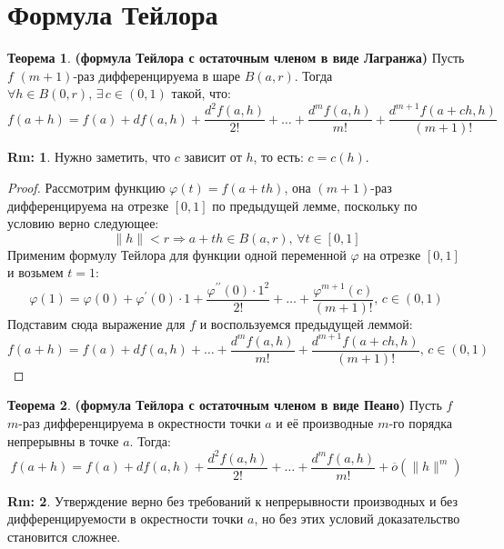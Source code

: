 \documentclass[12pt]{article}
\theoremstyle{definition}
\newtheorem{rem}{Rm:}
\newtheorem{theorem}{Теорема}
\begin{document}
\newpage
\section*{Формула Тейлора}
\begin{theorem}\textbf{(формула Тейлора с остаточным членом в виде Лагранжа)}
	Пусть $f$ $(m+1)$-раз дифференцируема в шаре $B(a,r)$. Тогда $\forall h \in B(0,r), \, \exists \, c \in (0,1)$ такой, что:
	$$ 
		f(a+h) = f(a) + df(a,h) + \dfrac{d^2f(a,h)}{2!} + \dotsc + \dfrac{d^mf(a,h)}{m!} + \dfrac{d^{m+1}f(a + ch,h)}{(m+1)!}
	$$
\end{theorem}
\begin{rem}
	Нужно заметить, что $c$ зависит от $h$, то есть: $c = c(h)$.
\end{rem}
\begin{proof}
	Рассмотрим функцию $\varphi(t) = f(a + th)$, она $(m+1)$-раз дифференцируема на отрезке $[0,1]$ по предыдущей лемме, поскольку по условию верно следующее: 
	$$
		\|h\| < r \Rightarrow a + th \in B(a,r), \, \forall t \in [0,1] 
	$$
	Применим формулу Тейлора для функции одной переменной $\varphi$ на отрезке $[0,1]$ и возьмем $t=1$:
	$$
		\varphi(1) = \varphi(0) + \varphi^\prime(0){\cdot}1 + \dfrac{\varphi^{\prime\prime}(0){\cdot}1^2}{2!} + \dotsc + \dfrac{\varphi^{m+1}(c)}{(m+1)!}, \, c \in (0,1)
	$$
	Подставим сюда выражение для $f$ и воспользуемся предыдущей леммой:
	$$
		f(a + h) = f(a) + df(a,h) + \dotsc + \dfrac{d^mf(a,h)}{m!} + \dfrac{d^{m+1}f(a + ch,h)}{(m+1)!}, \, c \in (0,1)
	$$
\end{proof}

\begin{theorem}\textbf{(формула Тейлора с остаточным членом в виде Пеано)}
	Пусть $f$ $m$-раз дифференцируема в окрестности точки $a$ и её производные $m$-го порядка непрерывны в точке $a$. Тогда:
	$$
		f(a+h) = f(a) + df(a,h) + \dfrac{d^2f(a,h)}{2!} + \dotsc + \dfrac{d^mf(a,h)}{m!} + \overline{o}(\|h\|^m)
	$$
\end{theorem}
\begin{rem}
	Утверждение верно без требований к непрерывности производных и без дифференцируемости в окрестности точки $a$, но без этих условий доказательство становится сложнее.
\end{rem}
\end{document}
